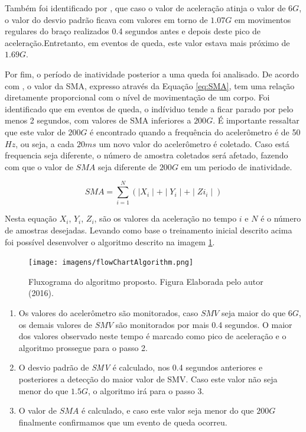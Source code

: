 Também foi identificado por \cite{hsieh2014wrist}, que caso o valor de aceleração atinja o valor de $6G$, o valor do desvio padrão ficava com valores em torno de $1.07G$  em movimentos regulares do braço realizados 0.4 segundos antes e depois deste pico de aceleração.Entretanto, em eventos de queda, este valor estava mais próximo de $1.69G$. 

Por fim, o período de inatividade posterior a uma queda foi analisado. De acordo com \cite{hsieh2014wrist}, o valor da \ac{SMA}, expresso através da Equação \ref{eq:SMA}, tem uma relação diretamente proporcional com o nível de movimentação de um corpo. Foi identificado que em eventos de queda, o indíviduo tende a ficar parado por pelo menos 2 segundos, com valores de SMA inferiores a $200G$. É importante ressaltar que este valor de $200G$ é encontrado quando a frequência do acelerômetro é de 50 $Hz$, ou seja, a cada $20 ms$ um novo valor do acelerômetro é coletado. Caso
está frequencia seja diferente, o número de amostra coletados será afetado, fazendo com que o valor de $SMA$ seja diferente de $200G$ em um periodo de inatividade.

\begin{equation}
SMA = \sum_{i=1}^{N} (\mid X_i\mid + \mid Y_i \mid + \mid Zi_i \mid)
\label{eq:SMA}
\end{equation}

Nesta equação $X_i$, $Y_i$, $Z_i$, são os valores da aceleração no tempo $i$ e $N$ é o número de amostras desejadas. Levando como base o treinamento inicial descrito acima foi possível desenvolver o algoritmo descrito na imagem \ref{fig:flow_chart}.

\begin{figure}[ht]
	\centering
	\texttt{[image: imagens/flowChartAlgorithm.png]}
	\caption{ Fluxograma do algoritmo proposto. Figura Elaborada pelo autor (2016).}
	\label{fig:flow_chart}
\end{figure} 

	\begin{enumerate}
		\item Os valores do acelerômetro são monitorados, caso $SMV$ seja maior do que $6G$, os demais valores de $SMV$ são monitorados por mais 0.4 segundos. O maior dos valores observado neste tempo é marcado como pico de aceleração e o algoritmo prossegue para o passo 2.
		\item O desvio padrão de \textit{SMV} é calculado, nos 0.4 segundos anteriores e posteriores a detecção do maior valor de SMV. Caso este valor não seja menor do que $1.5G$,  o algoritmo irá para o passo 3.
		\item O valor de $SMA$ é calculado, e caso este valor seja menor do que $ 200G $ finalmente confirmamos que um evento de queda ocorreu.
	\end{enumerate}

